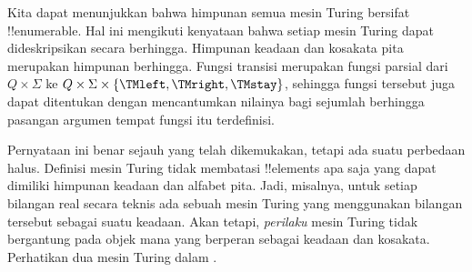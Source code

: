 \documentclass[../../../include/open-logic-section]{subfiles}
\begin{document}

\begin{explain}
Kita dapat menunjukkan bahwa himpunan semua mesin Turing bersifat
!!{enumerable}. Hal ini mengikuti kenyataan bahwa setiap mesin Turing dapat
dideskripsikan secara berhingga. Himpunan keadaan dan kosakata pita merupakan
himpunan berhingga. Fungsi transisi merupakan fungsi parsial dari $Q \times
\Sigma$ ke $Q \times \Sigma \times \{\TMleft, \TMright, \TMstay\}$, sehingga
fungsi tersebut juga dapat ditentukan dengan mencantumkan nilainya bagi
sejumlah berhingga pasangan argumen tempat fungsi itu terdefinisi.

Pernyataan ini benar sejauh yang telah dikemukakan, tetapi ada suatu perbedaan
halus. Definisi mesin Turing tidak membatasi !!{element}s apa saja yang dapat
dimiliki himpunan keadaan dan alfabet pita. Jadi, misalnya, untuk setiap
bilangan real secara teknis ada sebuah mesin Turing yang menggunakan bilangan
tersebut sebagai suatu keadaan. Akan tetapi, \emph{perilaku} mesin Turing tidak
bergantung pada objek mana yang berperan sebagai keadaan dan kosakata.
Perhatikan dua mesin Turing dalam .
\begin{figure}
\begin{center}
\\
\end{center}
\end{figure}
\end{explain}
\end{document}
